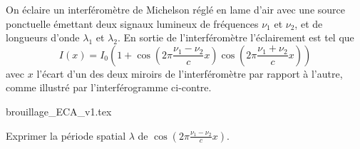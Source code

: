                                 \initialisationPartieGauche %
On éclaire un interféromètre de Michelson réglé en lame d'air avec une source ponctuelle émettant deux signaux lumineux de fréquences $\nu_1$ et $\nu_2$, et de longueurs d'onde $\lambda_1$ et $\lambda_2$. En sortie de l'interféromètre l'éclairement est tel que
$$
I(x) = I_0 \left( 1 +  \cos\left( 2\pi\frac{\nu_1 - \nu_2}{c}x \right) \cos\left(  2\pi\frac{\nu_1 + \nu_2}{c}x \right) \right)
$$
avec $x$ l'écart d'un des deux miroirs de l'interféromètre par rapport à l'autre, comme illustré par l'interférogramme ci-contre.

\initialisationPartieDroite %
\begin{center}
	{brouillage_ECA_v1.tex}
\end{center}
\finalisationDuPartageDePage %

\debutEntrainement


\begin{enonce}
	Exprimer la période spatial $\lambda$ de $\cos\left( 2\pi\frac{\nu_1 - \nu_2}{c}x \right)$.
\end{enonce}
	

